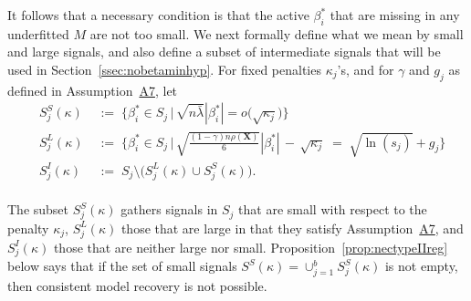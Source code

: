 \documentclass[bj,authoryear]{imsart}
\theoremstyle{plain}
\newcommand{\david}[1]{{\small{\color{blue} \sf $\heartsuit$ [David: #1]}}}
\newcommand{\bs}{\boldsymbol}
\begin{document}
It follows that a necessary condition is that the active $\beta_i^*$ that are missing in any underfitted $M$ are not too small. We next formally define what we mean by small and large signals, and also define a subset of intermediate signals 
that will be used in Section~\ref{ssec:nobetaminhyp}.  For fixed penalties $\kappa_j$'s, and for %
$\gamma$ and $g_j$ as defined in Assumption~\hyperlink{lab:A7}{A7}, let
\begin{eqnarray}\label{eq:defSes}
    &S_j^{S}(\kappa)\;&:=\;\Bigg\{\beta_i^* \in S_j \,\Big|\,\sqrt{n\bar{\lambda}}|\beta_{i}^*|=o\big(\sqrt{\kappa_j}\big) \Bigg\}\nonumber\\
    &S_j^{L}(\kappa)\;&:=\;\Bigg\{\beta_i^* \in S_j \,\Big|\,\sqrt{\frac{(1-\gamma) n\rho(\bs X)}{6}}|\beta_{i}^*| \,- \,\sqrt{\kappa_j} \;=\; \sqrt{\ln(s_j)} + g_j\Bigg\}\label{eq:defslsi}\\
    &S_j^{I}(\kappa)\;&:=\;S_j \setminus \big(S_j^{L}(\kappa) \cup S_j^{S}(\kappa)\big).
    \nonumber 
\end{eqnarray} \\
The subset $S_j^{S}(\kappa)$ gathers signals in $S_j$ that are small with respect to the penalty $\kappa_j$, $S_j^{L}(\kappa)$ those that are large in that they satisfy Assumption~\hyperlink{lab:A7}{A7}, and $S_j^{I}(\kappa)$ those that are neither large nor small. 
Proposition~\ref{prop:nectypeIIreg} below says that if the set of small signals $S^{S}(\kappa)=\cup_{j=1}^b S_j^{S}(\kappa)$ is not empty, then consistent model recovery is not possible.
\end{document}
